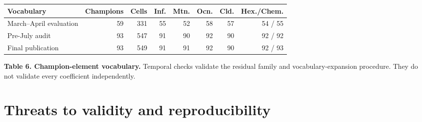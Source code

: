 \documentclass[10pt,letterpaper]{article}
\newcommand{\fineprint}[1]{{\footnotesize\color{muted}#1}}
\begin{document}
\begin{center}
\begin{minipage}{\linewidth}
\centering
\small
\begin{tabular}{@{}lrrrrrrr@{}}
\toprule
\textbf{Vocabulary} & \textbf{Champions} & \textbf{Cells} & \textbf{Inf.} & \textbf{Mtn.} & \textbf{Ocn.} & \textbf{Cld.} & \textbf{Hex./Chem.} \\
\midrule
March--April evaluation & 59 & 331 & 55 & 52 & 58 & 57 & 54 / 55 \\
Pre-July audit & 93 & 547 & 91 & 90 & 92 & 90 & 92 / 92 \\
Final publication & 93 & 549 & 91 & 91 & 92 & 90 & 92 / 93 \\
\bottomrule
\end{tabular}
\vspace{0.20em}

\fineprint{\textbf{Table 6. Champion-element vocabulary.} Temporal checks validate the residual family and vocabulary-expansion procedure. They do not validate every coefficient independently.}
\end{minipage}
\end{center}

\section{Threats to validity and reproducibility}
\end{document}
